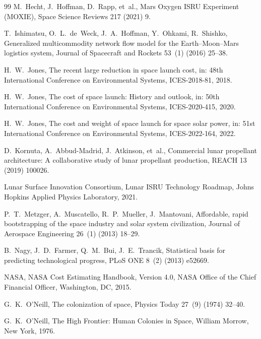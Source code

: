 \documentclass[preprint,12pt]{elsarticle}
\begin{document}
\begin{thebibliography}{99}
M.~Hecht, J.~Hoffman, D.~Rapp, et~al.,
\newblock Mars Oxygen ISRU Experiment (MOXIE),
\newblock Space Science Reviews 217 (2021) 9.

T.~Ishimatsu, O.~L.~de~Weck, J.~A.~Hoffman, Y.~Ohkami, R.~Shishko,
\newblock Generalized multicommodity network flow model for the Earth--Moon--Mars logistics system,
\newblock Journal of Spacecraft and Rockets 53~(1) (2016) 25--38.

H.~W.~Jones,
\newblock The recent large reduction in space launch cost,
\newblock in: 48th International Conference on Environmental Systems, ICES-2018-81, 2018.

H.~W.~Jones,
\newblock The cost of space launch: History and outlook,
\newblock in: 50th International Conference on Environmental Systems, ICES-2020-415, 2020.

H.~W.~Jones,
\newblock The cost and weight of space launch for space solar power,
\newblock in: 51st International Conference on Environmental Systems, ICES-2022-164, 2022.

D.~Kornuta, A.~Abbud-Madrid, J.~Atkinson, et~al.,
\newblock Commercial lunar propellant architecture: A collaborative study of lunar propellant production,
\newblock REACH 13 (2019) 100026.

Lunar Surface Innovation Consortium,
\newblock Lunar ISRU Technology Roadmap,
\newblock Johns Hopkins Applied Physics Laboratory, 2021.

P.~T.~Metzger, A.~Muscatello, R.~P.~Mueller, J.~Mantovani,
\newblock Affordable, rapid bootstrapping of the space industry and solar system civilization,
\newblock Journal of Aerospace Engineering 26~(1) (2013) 18--29.

B.~Nagy, J.~D.~Farmer, Q.~M.~Bui, J.~E.~Trancik,
\newblock Statistical basis for predicting technological progress,
\newblock PLoS ONE 8~(2) (2013) e52669.

NASA,
\newblock NASA Cost Estimating Handbook, Version 4.0,
\newblock NASA Office of the Chief Financial Officer, Washington, DC, 2015.

G.~K.~O'Neill,
\newblock The colonization of space,
\newblock Physics Today 27~(9) (1974) 32--40.

G.~K.~O'Neill,
\newblock The High Frontier: Human Colonies in Space,
\newblock William Morrow, New York, 1976.


\end{thebibliography}
\end{document}
